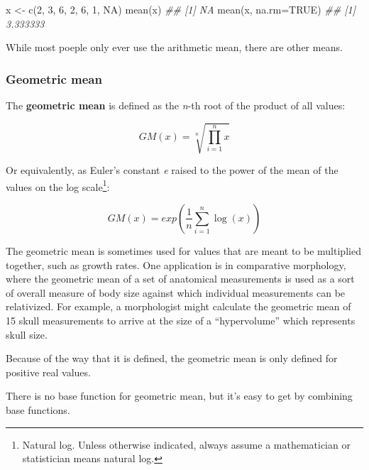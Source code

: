 \documentclass[
  13,
  letterpaper,
]{report}
\newenvironment{Shaded}{\begin{snugshade}}{\end{snugshade}}
\newcommand{\AttributeTok}[1]{\textcolor[rgb]{0.40,0.45,0.13}{#1}}
\newcommand{\ConstantTok}[1]{\textcolor[rgb]{0.56,0.35,0.01}{#1}}
\newcommand{\DecValTok}[1]{\textcolor[rgb]{0.68,0.00,0.00}{#1}}
\newcommand{\DocumentationTok}[1]{\textcolor[rgb]{0.37,0.37,0.37}{\textit{#1}}}
\newcommand{\FunctionTok}[1]{\textcolor[rgb]{0.28,0.35,0.67}{#1}}
\newcommand{\NormalTok}[1]{\textcolor[rgb]{0.00,0.23,0.31}{#1}}
\newcommand{\OtherTok}[1]{\textcolor[rgb]{0.00,0.23,0.31}{#1}}
\begin{document}
\begin{Shaded}
\begin{Highlighting}[]

\NormalTok{x }\OtherTok{\textless{}{-}} \FunctionTok{c}\NormalTok{(}\DecValTok{2}\NormalTok{, }\DecValTok{3}\NormalTok{, }\DecValTok{6}\NormalTok{, }\DecValTok{2}\NormalTok{, }\DecValTok{6}\NormalTok{, }\DecValTok{1}\NormalTok{, }\ConstantTok{NA}\NormalTok{)}
\FunctionTok{mean}\NormalTok{(x)}
\DocumentationTok{\#\# [1] NA}
\FunctionTok{mean}\NormalTok{(x, }\AttributeTok{na.rm=}\ConstantTok{TRUE}\NormalTok{)}
\DocumentationTok{\#\# [1] 3.333333}
\end{Highlighting}
\end{Shaded}

While most poeple only ever use the arithmetic mean, there are other
means.

\subsubsection{Geometric mean}\label{sec-desc-cen-mean-gm}

The \textbf{geometric mean} is defined as the \emph{n}-th root of the
product of all values:

\[GM\left(x\right)=\sqrt[n]{\prod_{i=1}^{n}x}\]

Or equivalently, as Euler's constant \emph{e} raised to the power of the
mean of the values on the log scale\footnote{Natural log. Unless
  otherwise indicated, always assume a mathematician or statistician
  means natural log.}:

\[GM\left(x\right)=exp\left(\frac{1}{n}\sum_{i=1}^{n}\log{\left(x\right)}\right)\]

The geometric mean is sometimes used for values that are meant to be
multiplied together, such as growth rates. One application is in
comparative morphology, where the geometric mean of a set of anatomical
measurements is used as a sort of overall measure of body size against
which individual measurements can be relativized. For example, a
morphologist might calculate the geometric mean of 15 skull measurements
to arrive at the size of a ``hypervolume'' which represents skull size.

Because of the way that it is defined, the geometric mean is only
defined for positive real values.

There is no base function for geometric mean, but it's easy to get by
combining base functions.
\end{document}
